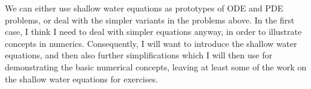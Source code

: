 We can either use shallow water equations as prototypes of ODE and
PDE problems, or deal with the simpler variants in the problems
above.  In the first case, I think I need to deal with simpler
equations anyway, in order to illustrate concepts in numerics.
Consequently, I will want to introduce the shallow water equations,
and then also further simplifications which I will then use for
demonstrating the basic numerical concepts, leaving at least some of
the work on the shallow water equations for exercises.


